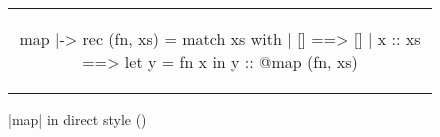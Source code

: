 \begin{figure}[tp]
\begin{tabular}{c}
\begin{Datalang}
map |-> rec (fn, xs) =
  match xs with
  | [] ==> 
      []
  | x :: xs ==>
      let y = fn x in
      y :: @map (fn, xs)
\end{Datalang}
\end{tabular}
\caption{\datalang|map| in direct style (\DataLang)}
\label{fig:map}
\end{figure}